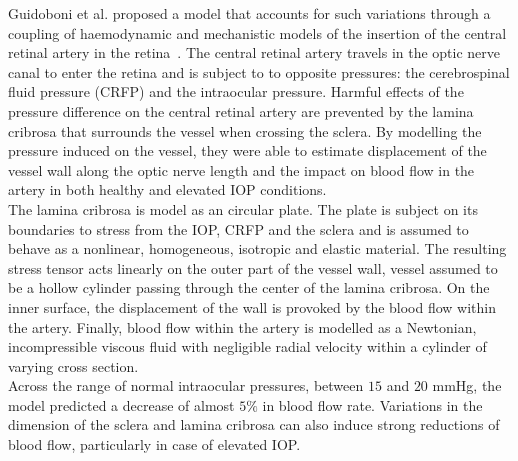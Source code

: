 \documentclass[12pt,a4paper]{article}
\begin{document}
Guidoboni et al. proposed a model that accounts for such variations through a coupling of haemodynamic and mechanistic models of the insertion of the central retinal artery in the retina~\cite{Guidoboni_2014}.
The central retinal artery travels in the optic nerve canal to enter the retina and is subject to to opposite pressures: the cerebrospinal fluid pressure (CRFP) and the intraocular pressure.
Harmful effects of the pressure difference on the central retinal artery are prevented by the lamina cribrosa that surrounds the vessel when crossing the sclera.
By modelling the pressure induced on the vessel, they were able to estimate displacement of the vessel wall along the optic nerve length and the impact on blood flow in the artery in both healthy and elevated IOP conditions.\\
The lamina cribrosa is model as an circular plate.
The plate is subject on its boundaries to stress from the IOP, CRFP and the sclera and is assumed to behave as a nonlinear, homogeneous, isotropic and elastic material.
The resulting stress tensor acts linearly on the outer part of the vessel wall, vessel assumed to be a hollow cylinder passing through the center of the lamina cribrosa.
On the inner surface, the displacement of the wall is provoked by the blood flow within the artery.
Finally, blood flow within the artery is modelled as a Newtonian, incompressible viscous fluid with negligible radial velocity within a cylinder of varying cross section.\\
Across the range of normal intraocular pressures, between $15$ and $20$ mmHg, the model predicted a decrease of almost $5\%$ in blood flow rate.
Variations in the dimension of the sclera and lamina cribrosa can also induce strong reductions of blood flow, particularly in case of elevated IOP. \\
\end{document}
